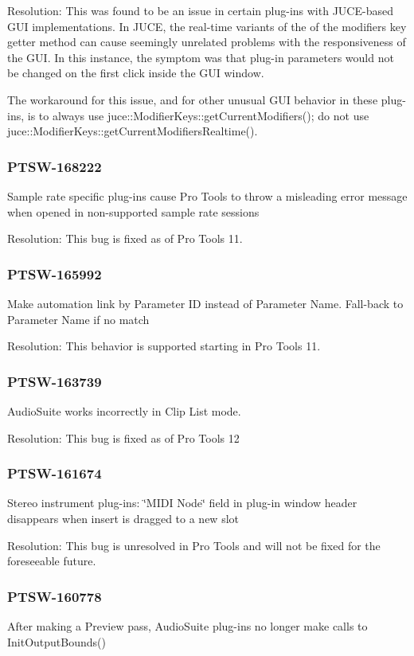 Resolution\+: This was found to be an issue in certain plug-\/ins with J\+U\+C\+E-\/based G\+U\+I implementations. In J\+U\+C\+E, the real-\/time variants of the of the modifiers key getter method can cause seemingly unrelated problems with the responsiveness of the G\+U\+I. In this instance, the symptom was that plug-\/in parameters would not be changed on the first click inside the G\+U\+I window.

The workaround for this issue, and for other unusual G\+U\+I behavior in these plug-\/ins, is to always use {\ttfamily juce\+::\+Modifier\+Keys\+::get\+Current\+Modifiers()}; do not use {\ttfamily juce\+::\+Modifier\+Keys\+::get\+Current\+Modifiers\+Realtime()}.\hypertarget{a00374_PTSW-168222}{}\subsubsection{P\+T\+S\+W-\/168222}\label{a00374_PTSW-168222}
Sample rate specific plug-\/ins cause Pro Tools to throw a misleading error message when opened in non-\/supported sample rate sessions

Resolution\+: This bug is fixed as of Pro Tools 11.\hypertarget{a00374_PTSW-165992}{}\subsubsection{P\+T\+S\+W-\/165992}\label{a00374_PTSW-165992}
Make automation link by Parameter I\+D instead of Parameter Name. Fall-\/back to Parameter Name if no match

Resolution\+: This behavior is supported starting in Pro Tools 11.\hypertarget{a00374_PTSW-163739}{}\subsubsection{P\+T\+S\+W-\/163739}\label{a00374_PTSW-163739}
Audio\+Suite works incorrectly in Clip List mode.

Resolution\+: This bug is fixed as of Pro Tools 12\hypertarget{a00374_PTSW-161674}{}\subsubsection{P\+T\+S\+W-\/161674}\label{a00374_PTSW-161674}
Stereo instrument plug-\/ins\+: \char`\"{}\+M\+I\+D\+I Node\char`\"{} field in plug-\/in window header disappears when insert is dragged to a new slot

Resolution\+: This bug is unresolved in Pro Tools and will not be fixed for the foreseeable future.\hypertarget{a00374_PTSW-160778}{}\subsubsection{P\+T\+S\+W-\/160778}\label{a00374_PTSW-160778}
After making a Preview pass, Audio\+Suite plug-\/ins no longer make calls to Init\+Output\+Bounds()

